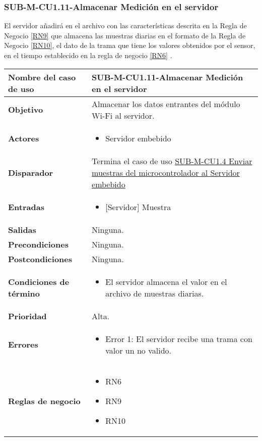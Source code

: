 \subsubsection{SUB-M-CU1.11-Almacenar Medición en el servidor}\label{SUB-M-CU1.11}
El servidor añadirá en el archivo con las características descrita en la Regla de Negocio \ref{RN9} que almacena las muestras diarias en el formato de la Regla de Negocio \ref{RN10}, el dato de la trama que tiene los valores obtenidos por el sensor, en el tiempo establecido en la regla de negocio \ref{RN6} .

\begin{longtable}{|J{5cm}|J{10.3cm}|}
	\hline
	\textbf{Nombre del caso de uso} &
		SUB-M-CU1.11-Almacenar Medición en el servidor \\ \hline
	\textbf{Objetivo} &
		Almacenar los datos entrantes del módulo Wi-Fi al servidor. \\ \hline
	\textbf{Actores} &
		\begin{itemize}
			\item Servidor embebido
		\end{itemize} \\ \hline
	\textbf{Disparador} & 
	    Termina el caso de uso \hyperref[SUB-M-CU1.4]{SUB-M-CU1.4 Enviar muestras del microcontrolador al Servidor embebido} \\ \hline 
	\textbf{Entradas} & 
		\begin{itemize}
				\item{[Servidor]} Muestra
		\end{itemize}\\ \hline 
	\textbf{Salidas} & 
        Ninguna. \\ \hline
	\textbf{Precondiciones} &
	    Ninguna. \\ \hline
	\textbf{Postcondiciones} &
		Ninguna.\\ \hline
	\textbf{Condiciones de término} & 
		\begin{itemize}
			\item El servidor almacena el valor en el archivo de muestras diarias.
		\end{itemize} \\ \hline 
	\textbf{Prioridad} & 
		Alta. \\ \hline
	\textbf{Errores} & 
		\begin{itemize}
		    \item \label{CU11:Error1} Error 1: El servidor recibe una trama con valor un no valido.
		\end{itemize} \\ \hline
	\textbf{Reglas de negocio} & 
		\begin{itemize}
            \item RN6
            \item RN9
            \item RN10
		\end{itemize} \\ \hline

\end{longtable}

